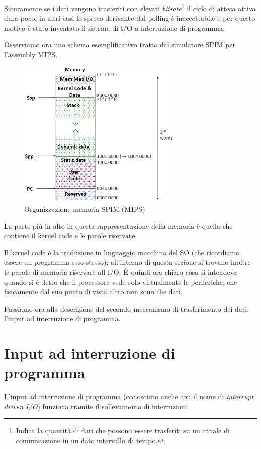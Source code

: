 \documentclass[class=book, crop=false, oneside]{standalone}
\begin{document}
Sicuramente se i dati vengono trasferiti con elevati \emph{bitrate}\footnote{Indica la quantità di dati che possono essere trasferiti su un canale di comunicazione in un dato intervallo di tempo.} il ciclo di attesa attiva dura poco, in altri casi lo spreco derivante dal polling è inaccettabile e per questo motivo è stato inventato il sistema di I/O a interruzione di programma.

Osserviamo ora uno schema esemplificativo tratto dal simulatore SPIM per l'assembly MIPS.
\begin{figure}[!h]
	\centering
	\includegraphics[width=0.7\textwidth,keepaspectratio]{SPIM}
	\caption{Organizzazione memoria SPIM (MIPS)}
\end{figure}
La parte più in alto in questa rappresentazione della memoria è quella che contiene il kernel code e le parole riservate.

Il kernel code è la traduzione in linguaggio macchina del SO (che ricordiamo essere un programma esso stesso); all'interno di questa sezione si trovano inoltre le parole di memoria riservare all I/O. È quindi ora chiaro cosa si intendeva quando si è detto che il processore vede solo virtualmente le periferiche, che fisicamente dal suo punto di vista altro non sono che dati.

Passiamo ora alla descrizione del secondo meccanismo di trasferimento dei dati: l'input ad interruzione di programma.

\section{Input ad interruzione di programma}
L'input ad interruzione di programma (conosciuto anche con il nome di \emph{interrupt driven I/O}) funziona tramite il sollevamento di interruzioni.
\end{document}

